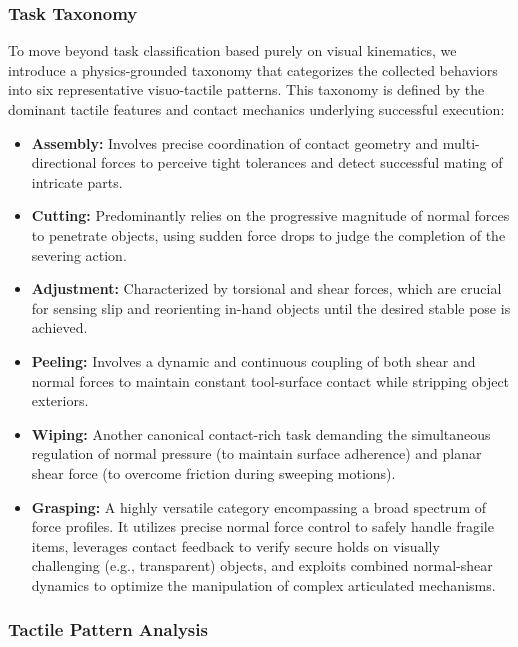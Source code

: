 \subsubsection{Task Taxonomy}
To move beyond task classification based purely on visual kinematics, we introduce a physics-grounded taxonomy that categorizes the collected behaviors into six representative visuo-tactile patterns. This taxonomy is defined by the dominant tactile features and contact mechanics underlying successful execution:
\begin{itemize}
    \item \textbf{Assembly:} Involves precise coordination of contact geometry and multi-directional forces to perceive tight tolerances and detect successful mating of intricate parts.
    \item \textbf{Cutting:} Predominantly relies on the progressive magnitude of normal forces to penetrate objects, using sudden force drops to judge the completion of the severing action.
    \item \textbf{Adjustment:} Characterized by torsional and shear forces, which are crucial for sensing slip and reorienting in-hand objects until the desired stable pose is achieved.
    \item \textbf{Peeling:} Involves a dynamic and continuous coupling of both shear and normal forces to maintain constant tool-surface contact while stripping object exteriors.
    \item \textbf{Wiping:} Another canonical contact-rich task demanding the simultaneous regulation of normal pressure (to maintain surface adherence) and planar shear force (to overcome friction during sweeping motions).
    \item \textbf{Grasping:} A highly versatile category encompassing a broad spectrum of force profiles. It utilizes precise normal force control to safely handle fragile items, leverages contact feedback to verify secure holds on visually challenging (e.g., transparent) objects, and exploits combined normal-shear dynamics to optimize the manipulation of complex articulated mechanisms.
\end{itemize}



\subsubsection{Tactile Pattern Analysis}


